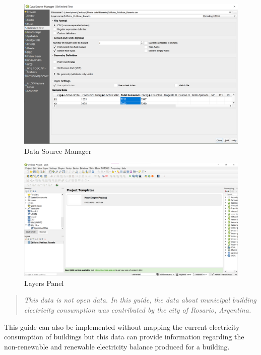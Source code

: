 \documentclass[
]{book}
\begin{document}
\begin{figure}

{\centering \includegraphics[width=1\linewidth]{images/qgis3} 

}

\caption{Data Source Manager}\label{fig:img-10}
\end{figure}
\begin{figure}

{\centering \includegraphics[width=1\linewidth]{images/layerspanel} 

}

\caption{Layers Panel}\label{fig:img-101}
\end{figure}

\begin{quote}
\emph{This data is not open data. In this guide, the data about municipal building electricity consumption was contributed by the city of Rosario, Argentina.}
\end{quote}

This guide can also be implemented without mapping the current electricity consumption of buildings but this data can provide information regarding the non-renewable and renewable electricity balance produced for a building.
\end{document}
